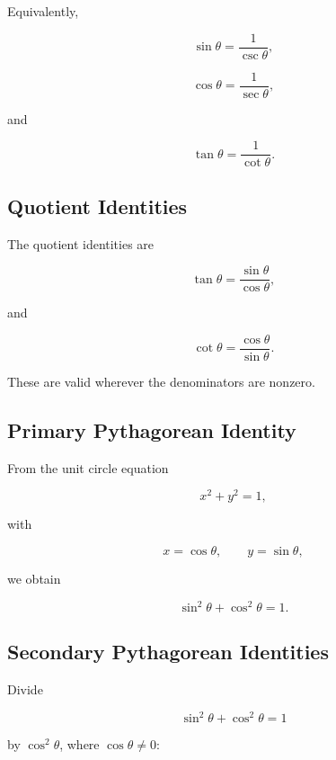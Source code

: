 Equivalently,

\[
\boxed{
\sin\theta
=
\frac{1}{\csc\theta},
}
\]

\[
\boxed{
\cos\theta
=
\frac{1}{\sec\theta},
}
\]

and

\[
\boxed{
\tan\theta
=
\frac{1}{\cot\theta}.
}
\]

\subsection{Quotient Identities}
\label{subsec:quotient-trig-identities}

The quotient identities are

\[
\boxed{
\tan\theta
=
\frac{\sin\theta}{\cos\theta},
}
\]

and

\[
\boxed{
\cot\theta
=
\frac{\cos\theta}{\sin\theta}.
}
\]

These are valid wherever the denominators are nonzero.

\subsection{Primary Pythagorean Identity}
\label{subsec:primary-pythagorean-trig}

From the unit circle equation

\[
x^2+y^2=1,
\]

with

\[
x=\cos\theta,
\qquad
y=\sin\theta,
\]

we obtain

\[
\boxed{
\sin^2\theta+\cos^2\theta=1.
}
\]

\subsection{Secondary Pythagorean Identities}
\label{subsec:secondary-pythagorean-trig}

Divide

\[
\sin^2\theta+\cos^2\theta=1
\]

by \(\cos^2\theta\), where \(\cos\theta\neq0\):

